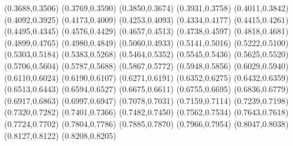 (0.3688,0.3506)                              
(0.3769,0.3590)                              
(0.3850,0.3674)                              
(0.3931,0.3758)                              
(0.4011,0.3842)                              
(0.4092,0.3925)                              
(0.4173,0.4009)                              
(0.4253,0.4093)                              
(0.4334,0.4177)                              
(0.4415,0.4261)                              
(0.4495,0.4345)                              
(0.4576,0.4429)                              
(0.4657,0.4513)                              
(0.4738,0.4597)                              
(0.4818,0.4681)                              
(0.4899,0.4765)                              
(0.4980,0.4849)                              
(0.5060,0.4933)                              
(0.5141,0.5016)                              
(0.5222,0.5100)                              
(0.5303,0.5184)                              
(0.5383,0.5268)                              
(0.5464,0.5352)                              
(0.5545,0.5436)                              
(0.5625,0.5520)                              
(0.5706,0.5604)                              
(0.5787,0.5688)                              
(0.5867,0.5772)                              
(0.5948,0.5856)                              
(0.6029,0.5940)                              
(0.6110,0.6024)                              
(0.6190,0.6107)                              
(0.6271,0.6191)                              
(0.6352,0.6275)                              
(0.6432,0.6359)                              
(0.6513,0.6443)                              
(0.6594,0.6527)                              
(0.6675,0.6611)                              
(0.6755,0.6695)                              
(0.6836,0.6779)                              
(0.6917,0.6863)                              
(0.6997,0.6947)                              
(0.7078,0.7031)                              
(0.7159,0.7114)                              
(0.7239,0.7198)                              
(0.7320,0.7282)                              
(0.7401,0.7366)                              
(0.7482,0.7450)                              
(0.7562,0.7534)                              
(0.7643,0.7618)                              
(0.7724,0.7702)                              
(0.7804,0.7786)                              
(0.7885,0.7870)                              
(0.7966,0.7954)                              
(0.8047,0.8038)                              
(0.8127,0.8122)                              
(0.8208,0.8205)                              
